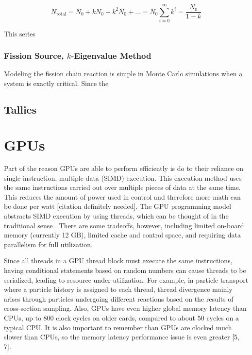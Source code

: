 \begin{equation}
\label{sub_crit_mult}
N_\mathrm{total} = N_0 + k N_0 + k^2 N_0 + \dots = N_0 \sum_{i=0}^\infty k^i = \frac{N_0}{1-k}
\end{equation}

This series

\subsubsection{Fission Source, $k$-Eigenvalue Method}




Modeling the fission chain reaction is simple in Monte Carlo simulations when a system is exactly critical.  Since the 
\cite{jaakko}

\subsection{Tallies}


\cite{jaakko}





\section{GPUs}

Part of the reason GPUs are able to perform efficiently is do to their reliance on single instruction, multiple data (SIMD) execution.  This execution method uses the same instructions carried out over multiple pieces of data at the same time.  This reduces the amount of power used in control and therefore more math can be done per watt [citation definitely needed].  The GPU programming model abstracts SIMD execution by using threads, which can be thought of in the traditional sense . There are some tradeoffs, however, including limited on-board memory (currently 12 GB), limited cache and control space, and requiring data parallelism for full utilization.

Since all threads in a GPU thread block must execute the same instructions, having conditional statements based on random numbers can cause threads to be serialized, leading to resource under-utilization.  For example, in particle transport where a particle history is assigned to each thread, thread divergence mainly arises through particles undergoing different reactions based on the results of cross-section sampling.  Also, GPUs have even higher global memory latency than CPUs, up to 800 clock cycles on older cards, compared to about 50 cycles on a typical CPU.  It is also important to remember than GPUs are clocked much slower than CPUs, so the memory latency performance issue is even greater [5, 7]. 

